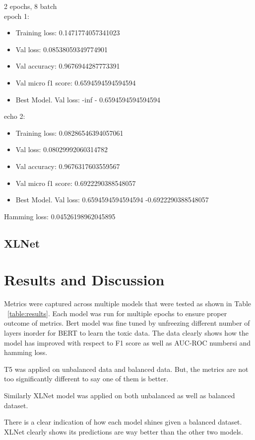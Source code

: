 \documentclass[11pt,a4paper]{article}
\begin{document}
2 epochs, 8 batch \\
epoch 1:
\begin{itemize}
\item Training loss: 0.1471774057341023
\item Val loss: 0.08538059349774901
\item Val accuracy: 0.9676944287773391
\item Val micro f1 score: 0.6594594594594594
\item \-\-\- Best Model. Val loss: -inf - 0.6594594594594594
\end{itemize}
echo 2:
\begin{itemize}
\item Training loss: 0.08286546394057061
\item Val loss: 0.08029992060314782
\item Val accuracy: 0.9676317603559567
\item Val micro f1 score: 0.6922290388548057
\item \-\-\- Best Model. Val loss: 0.6594594594594594 -0.6922290388548057
\end{itemize}

Hamming loss: 0.04526198962045895


\subsection{XLNet}

\section{Results and Discussion}
Metrics were captured across multiple models that were tested as shown in Table ~\ref{table:results}. Each model was run for multiple epochs to ensure proper outcome of metrics. Bert model was fine tuned by unfreezing different number of layers inorder for BERT to learn the toxic data. The data clearly shows how the model has improved with respect to F1 score as well as AUC-ROC numbersi and hamming loss. 

T5 was applied on unbalanced data and balanced data. But, the metrics are not too significantly different to say one of them is better.

Similarly XLNet model was applied on both unbalanced as well as balanced dataset.

There is a clear indication of how each model shines given a balanced dataset. XLNet clearly shows its predictions are way better than the other two models.
\end{document}
